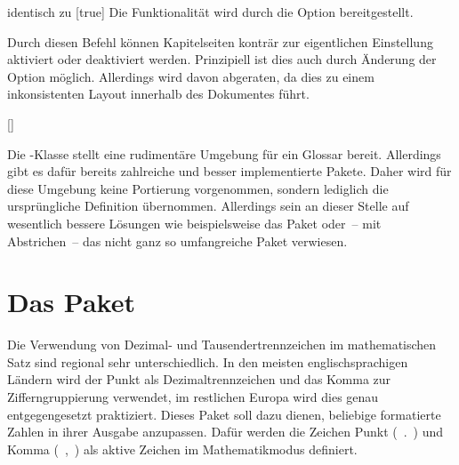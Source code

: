 \begin{Declaration}{}{%
  identisch zu [true]%
}
\printdeclarationlist%
%
Die Funktionalität wird durch die Option  bereitgestellt.
\end{Declaration}

\begin{Declaration}{}
\printdeclarationlist%
%
Durch diesen Befehl können Kapitelseiten konträr zur eigentlichen Einstellung 
aktiviert oder deaktiviert werden. Prinzipiell ist dies auch durch Änderung der 
Option  möglich. Allerdings wird davon abgeraten, da dies 
zu einem inkonsistenten Layout innerhalb des Dokumentes führt.
\end{Declaration}

\begin{Declaration}{[]}
\begin{Declaration}{}
\printdeclarationlist%
%
Die -Klasse stellt eine rudimentäre Umgebung für ein Glossar 
bereit. Allerdings gibt es dafür bereits zahlreiche und besser implementierte 
Pakete. Daher wird für diese Umgebung keine Portierung vorgenommen, sondern 
lediglich die ursprüngliche Definition übernommen. Allerdings sein an dieser 
Stelle auf wesentlich bessere Lösungen wie beispielsweise das Paket 
 oder~-- mit Abstrichen~-- das nicht ganz so umfangreiche 
Paket  verwiesen. 
\end{Declaration}
\end{Declaration}



\section{Das Paket }
%
%
%
%
Die Verwendung von Dezimal- und Tausendertrennzeichen im mathematischen Satz 
sind regional sehr unterschiedlich. In den meisten englischsprachigen Ländern 
wird der Punkt als Dezimaltrennzeichen und das Komma zur Zifferngruppierung 
verwendet, im restlichen Europa wird dies genau entgegengesetzt praktiziert.
Dieses Paket soll dazu dienen, beliebige formatierte Zahlen in ihrer Ausgabe 
anzupassen. Dafür werden die Zeichen Punkt (\ .\ ) und Komma (\ ,\ ) als 
aktive Zeichen im Mathematikmodus definiert.

